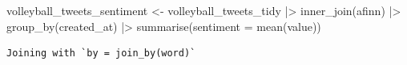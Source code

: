 \documentclass[
  letterpaper,
  DIV=11,
  numbers=noendperiod]{scrreprt}
\newenvironment{Shaded}{\begin{snugshade}}{\end{snugshade}}
\newcommand{\AttributeTok}[1]{\textcolor[rgb]{0.40,0.45,0.13}{#1}}
\newcommand{\FunctionTok}[1]{\textcolor[rgb]{0.28,0.35,0.67}{#1}}
\newcommand{\NormalTok}[1]{\textcolor[rgb]{0.00,0.23,0.31}{#1}}
\newcommand{\OtherTok}[1]{\textcolor[rgb]{0.00,0.23,0.31}{#1}}
\newcommand{\SpecialCharTok}[1]{\textcolor[rgb]{0.37,0.37,0.37}{#1}}
\begin{document}
\begin{Shaded}
\begin{Highlighting}[]
\NormalTok{volleyball\_tweets\_sentiment }\OtherTok{\textless{}{-}}\NormalTok{ volleyball\_tweets\_tidy }\SpecialCharTok{|\textgreater{}}
  \FunctionTok{inner\_join}\NormalTok{(afinn) }\SpecialCharTok{|\textgreater{}} 
  \FunctionTok{group\_by}\NormalTok{(created\_at) }\SpecialCharTok{|\textgreater{}} 
  \FunctionTok{summarise}\NormalTok{(}\AttributeTok{sentiment =} \FunctionTok{mean}\NormalTok{(value))}
\end{Highlighting}
\end{Shaded}

\begin{verbatim}
Joining with `by = join_by(word)`
\end{verbatim}
\end{document}
